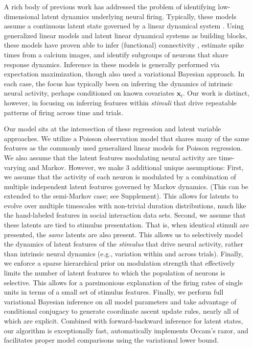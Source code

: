 \documentclass[10pt,letterpaper]{article}
\newcommand{\added}[1]{\textcolor{added}{#1}}
\begin{document}
\added{
A rich body of previous work has addressed the problem of identifying low-dimensional latent dynamics underlying neural firing. Typically, these models assume a continuous latent state governed by a linear dynamical system \cite{Pillow2008-em,Vogelstein2009-ax,Park2014-el,Buesing2014-ta,Archer2015-ec, Park2015-bp,Zhao2016-bw,Gao2016-ck}.
}
Using generalized linear models and latent linear dynamical systems as building blocks, these models have proven able to infer (functional) connectivity \cite{Pillow2008-em}, estimate spike times from a calcium images\cite{Vogelstein2009-ax}, and identify subgroups of neurons that share response dynamics\cite{Buesing2014-ta,Zhao2016-bw,Gao2016-ck}. Inference in these models is generally performed via expectation maximization, though \cite{Ulrich2014-zc,Putzky2014-up,Archer2015-ec,Park2015-bp, Zhao2016-bw,Gao2016-ck} also used a variational Bayesian approach.
\added{In each case, the focus has typically been on inferring the dynamics of intrinsic neural activity, perhaps conditioned on known covariates $\mathbf{x}_t$. Our work is distinct, however, in focusing on inferring features within \emph{stimuli} that drive repeatable patterns of firing across time and trials.}

Our model sits at the intersection of these regression and latent variable approaches. We utilize a Poisson observation model that shares many of the same features as the commonly used generalized linear models for Poisson regression. We also assume that the latent features modulating neural activity are time-varying and Markov. However, we make 3 additional unique assumptions: First, we assume that the activity of each neuron is modulated by a combination of multiple independent latent features governed by Markov dynamics. \added{(This can be extended to the semi-Markov case; see Supplement).} This allows for latents to evolve over multiple timescales with non-trivial duration distributions, much like the hand-labeled features in social interaction data sets. Second, we assume that these latents are tied to stimulus presentation. That is, when identical stimuli are presented, the \emph{same} latents are also present. This allows us to \added{selectively} model the dynamics of latent features of the \emph{stimulus} that drive neural activity, rather than intrinsic neural dynamics \added{(e.g., variation within and across trials)}. Finally, we enforce a sparse hierarchical prior on modulation strength that effectively limits the number of latent features to which the population of neurons is selective. This allows for a parsimonious explanation of the firing rates of single units in terms of a small set of stimulus features. Finally, we perform full variational Bayesian inference on all model parameters and take advantage of conditional conjugacy to generate coordinate ascent update rules, nearly all of which are explicit. Combined with forward-backward inference for latent states, our algorithm is exceptionally fast, automatically implements Occam's razor, and facilitates proper model comparisons using the variational lower bound.
\end{document}
